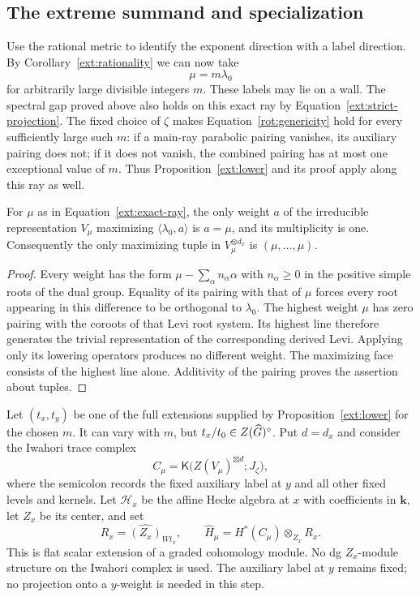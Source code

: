 \subsection{The extreme summand and specialization}

Use the rational metric to identify the exponent direction with a label
direction.  By Corollary~\ref{ext:rationality} we can now take
\begin{equation}\label{ext:exact-ray}
                 \mu=m\lambda_0
\end{equation}
for arbitrarily large divisible integers $m$.  These labels may lie on a
wall.  The spectral gap proved above also holds on this exact ray by
Equation~\eqref{ext:strict-projection}.  The fixed choice of $\zeta$
makes Equation~\eqref{rot:genericity} hold for every sufficiently large
such $m$: if a main-ray parabolic pairing vanishes, its auxiliary pairing
does not; if it does not vanish, the combined pairing has at most one
exceptional value of $m$.  Thus Proposition~\ref{ext:lower} and its proof
apply along this ray as well.

\begin{lemma}\label{ext:unique-extreme}
 For $\mu$ as in Equation~\eqref{ext:exact-ray}, the only weight $a$ of
 the irreducible representation $V_\mu$ maximizing
 $\langle\lambda_0,a\rangle$ is $a=\mu$, and its multiplicity is one.
 Consequently the only maximizing tuple in $V_\mu^{\otimes d_x}$ is
 $(\mu,\ldots,\mu)$.
\end{lemma}

\begin{proof}
 Every weight has the form $\mu-\sum_\alpha n_\alpha\alpha$ with
 $n_\alpha\ge0$ in the positive simple roots of the dual group.
 Equality of its pairing with that of $\mu$ forces every root appearing
 in this difference to be orthogonal to $\lambda_0$.  The highest
 weight $\mu$ has zero pairing with the coroots of that Levi root
 system.  Its highest line therefore generates the trivial
 representation of the corresponding derived Levi.  Applying only
 its lowering operators produces no different weight.  The maximizing
 face consists of the highest line alone.  Additivity of the pairing
 proves the assertion about tuples.
\end{proof}

Let $(t_x,t_y)$ be one of the full extensions supplied by
Proposition~\ref{ext:lower} for the chosen $m$.  It can vary with $m$,
but $t_x/t_0\in Z(\widehat G)^\circ$.  Put $d=d_x$ and consider the Iwahori
trace complex
\[
   C_\mu=\mathsf K\bigl(Z(V_\mu)^{\boxtimes d};J_\zeta\bigr),
\]
where the semicolon records the fixed auxiliary label at $y$ and all
other fixed levels and kernels.  Let $\mathcal H_x$ be the affine
Hecke algebra at $x$ with coefficients in $\mathbf k$, let $Z_x$ be
its center, and set
\[
  R_x=\widehat{(Z_x)}_{Wt_x},\qquad
  \widehat H_\mu=H^*(C_\mu)\otimes_{Z_x}R_x.
\]
This is flat scalar extension of a graded cohomology module.
No dg $Z_x$-module structure on the Iwahori complex is used.
The auxiliary label at $y$ remains fixed; no projection onto a
$y$-weight is needed in this step.

